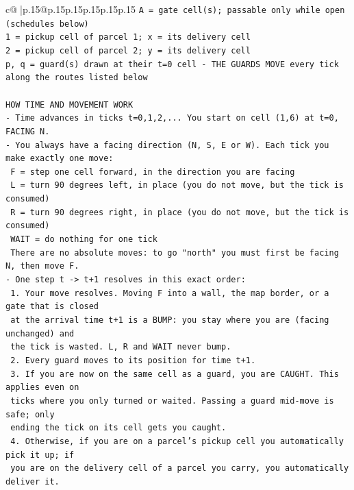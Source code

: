 \documentclass{article}
\begin{document}
{\begin{supertabular}{c@{$\;$}|p{.15\linewidth}@{}p{.15\linewidth}p{.15\linewidth}p{.15\linewidth}p{.15\linewidth}p{.15\linewidth}}
{{{\texttt{A = gate cell(s); passable only while open (schedules below)} \\
\texttt{1 = pickup cell of parcel 1; x = its delivery cell} \\
\texttt{2 = pickup cell of parcel 2; y = its delivery cell} \\
\texttt{p, q = guard(s) drawn at their t=0 cell {-} THE GUARDS MOVE every tick along the routes listed below} \\
\\ 
\texttt{HOW TIME AND MOVEMENT WORK} \\
\texttt{{-} Time advances in ticks t=0,1,2,... You start on cell (1,6) at t=0, FACING N.} \\
\texttt{{-} You always have a facing direction (N, S, E or W). Each tick you make exactly one move:} \\
\texttt{  F    = step one cell forward, in the direction you are facing} \\
\texttt{  L    = turn 90 degrees left, in place (you do not move, but the tick is consumed)} \\
\texttt{  R    = turn 90 degrees right, in place (you do not move, but the tick is consumed)} \\
\texttt{  WAIT = do nothing for one tick} \\
\texttt{  There are no absolute moves: to go "north" you must first be facing N, then move F.} \\
\texttt{{-} One step t {-}> t+1 resolves in this exact order:} \\
\texttt{  1. Your move resolves. Moving F into a wall, the map border, or a gate that is closed} \\
\texttt{     at the arrival time t+1 is a BUMP: you stay where you are (facing unchanged) and} \\
\texttt{     the tick is wasted. L, R and WAIT never bump.} \\
\texttt{  2. Every guard moves to its position for time t+1.} \\
\texttt{  3. If you are now on the same cell as a guard, you are CAUGHT. This applies even on} \\
\texttt{     ticks where you only turned or waited. Passing a guard mid{-}move is safe; only} \\
\texttt{     ending the tick on its cell gets you caught.} \\
\texttt{  4. Otherwise, if you are on a parcel's pickup cell you automatically pick it up; if} \\
\texttt{     you are on the delivery cell of a parcel you carry, you automatically deliver it.} \\
}}}
\end{supertabular}}
\end{document}
